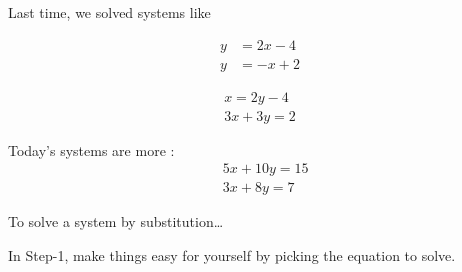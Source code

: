 
Last time, 
we solved systems like

\hfil
\begin{minipage}{0.3\textwidth}
    \begin{align*}
            y &= 2x - 4 \\
            y &= -x + 2
    \end{align*}
\end{minipage}
\begin{minipage}{0.3\textwidth}
    \begin{align*} 
        x = 2y - 4 \\
        3x + 3y =  2
    \end{align*}
\end{minipage}
\hfil

Today's systems are more :
\begin{align*} 
    &5x + 10y = 15 \\
    &3x + 8y =  7
\end{align*}

\begin{myConceptSteps}{To solve a system by substitution\dots}
\end{myConceptSteps}

\vspace{2\onelineskip} 
\begin{tcolorbox}[center,width=5.5in]
    In Step-1,
    make things easy for yourself  
    by picking the  equation to solve.
\end{tcolorbox}
